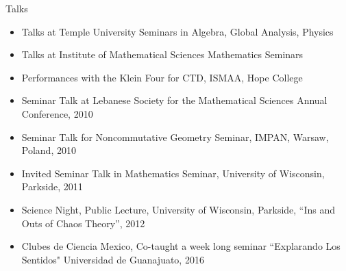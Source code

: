 \documentclass{resume} %
\begin{document}










\begin{rSection}{Talks}

\begin{itemize}
\item Talks at Temple University Seminars in Algebra, Global Analysis, Physics\\

\item Talks at Institute of Mathematical Sciences Mathematics Seminars\\

\item Performances with the Klein Four for CTD, ISMAA, Hope College\\

\item Seminar Talk at Lebanese Society for the Mathematical Sciences Annual Conference, 2010\\

\item Seminar Talk for Noncommutative Geometry Seminar, IMPAN, Warsaw, Poland, 2010\\

\item Invited Seminar Talk in Mathematics Seminar, University of Wisconsin, Parkside, 2011\\

\item Science Night, Public Lecture, University of Wisconsin, Parkside, “Ins and Outs of Chaos Theory”, 2012\\

\item Clubes de Ciencia Mexico, Co-taught a week long seminar ``Explarando Los Sentidos" Universidad de Guanajuato, 2016\\

\end{itemize}

\end{rSection}
\end{document}
